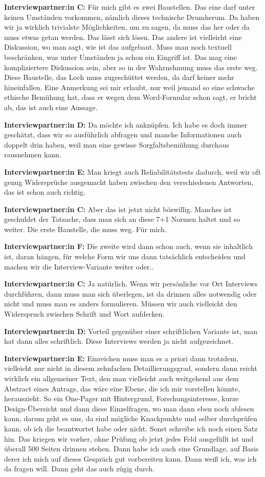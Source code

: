 \documentclass[a4paper,12pt,twoside,numbers=noendperiod]{scrreprt}
\begin{document}
\textbf{Interviewpartner:in C:} Für mich gibt es zwei Baustellen. Das eine darf unter keinen Umständen vorkommen, nämlich dieses technische Drumherum. Da haben wir ja wirklich trivialste Möglichkeiten, um zu sagen, da muss das her oder da muss etwas getan werden. Das lässt sich lösen. Das andere ist vielleicht eine Diskussion, wo man sagt, wie ist das aufgebaut. Muss man noch textuell beschränken, was unter Umständen ja schon ein Eingriff ist. Das mag eine kompliziertere Diskussion sein, aber so in der Wahrnehmung muss das erste weg. Diese Baustelle, das Loch muss zugeschüttet werden, da darf keiner mehr hineinfallen. Eine Anmerkung sei mir erlaubt, nur weil jemand so eine schwache ethische Bemühung hat, dass er wegen dem Word-Formular schon sagt, er bricht ab, das ist auch eine Aussage.

\textbf{Interviewpartner:in D:} Da möchte ich anknüpfen. Ich habe es doch immer geschätzt, dass wir so ausführlich abfragen und manche Informationen auch doppelt drin haben, weil man eine gewisse Sorgfaltsbemühung durchaus rausnehmen kann.

\textbf{Interviewpartner:in E:} Man kriegt auch Reliabilitätstests dadurch, weil wir oft genug Widersprüche ausgemacht haben zwischen den verschiedenen Antworten, das ist schon auch richtig.

\textbf{Interviewpartner:in C:} Aber das ist jetzt nicht böswillig. Manches ist geschuldet der Tatsache, dass man sich an diese 7+1 Normen haltet und so weiter. Die erste Baustelle, die muss weg. Für mich.

\textbf{Interviewpartner:in F:} Die zweite wird dann schon auch, wenn sie inhaltlich ist, daran hängen, für welche Form wir uns dann tatsächlich entscheiden und machen wir die Interview-Variante weiter oder..

\textbf{Interviewpartner:in C:} Ja natürlich. Wenn wir persönliche vor Ort Interviews durchführen, dann muss man sich überlegen, ist da drinnen alles notwendig oder nicht und muss man es anders formulieren. Müssen wir auch vielleicht den Widerspruch zwischen Schrift und Wort aufdecken.

\textbf{Interviewpartner:in D:} Vorteil gegenüber einer schriftlichen Variante ist, man hat dann alles schriftlich. Diese Interviews werden ja nicht aufgezeichnet.

\textbf{Interviewpartner:in E:} Einreichen muss man es a priori dann trotzdem, vielleicht nur nicht in diesem zehnfachen Detaillierungsgrad, sondern dann reicht wirklich ein allgemeiner Text, den man vielleicht auch weitgehend aus dem Abstract eines Antrags, das wäre eine Ebene, die ich mir vorstellen könnte, herauszieht. So ein One-Pager mit Hintergrund, Forschungsinteresse, kurze Design-Übersicht und dann diese Einzelfragen, wo man dann eben noch ablesen kann, darum geht es uns, da sind mögliche Knackpunkte und selber durchprüfen kann, ob ich die beantwortet habe oder nicht. Sonst schreibe ich noch einen Satz hin. Das kriegen wir vorher, ohne Prüfung ob jetzt jedes Feld ausgefüllt ist und überall 500 Seiten drinnen stehen. Dann habe ich auch eine Grundlage, auf Basis derer ich mich auf dieses Gespräch gut vorbereiten kann. Dann weiß ich, was ich da fragen will. Dann geht das auch zügig durch.
\end{document}
